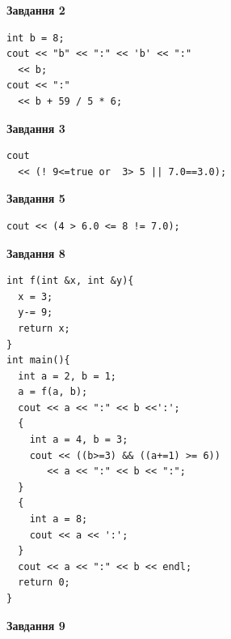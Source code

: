 \documentclass[12pt, ukrainian]{article}
\begin{document}
{\begin {large}
\begin{minipage}[t]{7.0cm}
\end{minipage}
\vline \hspace{1mm}
\begin{minipage}[t]{11.0cm}

\begin{center}
\textbf{Завдання 2}
\end{center}
\vspace{-8mm}

\begin{verbatim}
int b = 8;
cout << "b" << ":" << 'b' << ":" 
  << b;
cout << ":" 
  << b + 59 / 5 * 6;
\end{verbatim}



\begin{center}
\textbf{Завдання 3}
\end{center}
\vspace{-8mm}

\begin{verbatim}
cout 
  << (! 9<=true or  3> 5 || 7.0==3.0);
\end{verbatim}



\begin{center}
\textbf{Завдання 5}
\end{center}
\vspace{-8mm}

\begin{verbatim}
cout << (4 > 6.0 <= 8 != 7.0);
\end{verbatim}



\begin{center}
\textbf{Завдання 8}
\end{center}
\vspace{-8mm}

\begin{verbatim}
int f(int &x, int &y){
  x = 3;
  y-= 9;
  return x;
}
int main(){
  int a = 2, b = 1;
  a = f(a, b);
  cout << a << ":" << b <<':';
  {
    int a = 4, b = 3;
    cout << ((b>=3) && ((a+=1) >= 6))
       << a << ":" << b << ":";
  }
  {
    int a = 8;
    cout << a << ':';
  }
  cout << a << ":" << b << endl;
  return 0;
}
\end{verbatim}

\end{minipage}


\begin{minipage}[t]{7.0cm}

\begin{center}
\textbf{Завдання 9}
\end{center}
\vspace{-8mm}


\end{minipage}
\end{large}}
\end{document}
